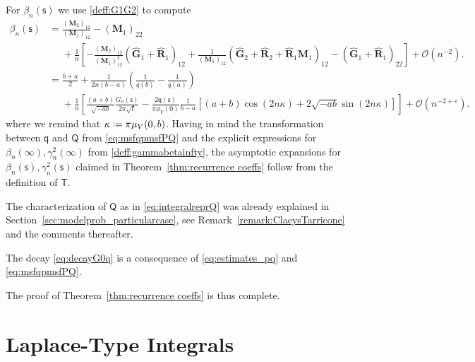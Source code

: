 \documentclass[reqno,a4paper,11pt]{amsart}
\newcommand{\Boh}{\mathcal{O}}
\renewcommand{\bm}{\mathbf}
\newcommand{\msf}{\mathsf}
\newcommand{\wh}{\widehat}
\newcommand{\sad}{\msf s}
\theoremstyle{definition}
\theoremstyle{remark}
\numberwithin{equation}{section}
\newcommand*{\defeq}{\mathrel{\vcenter{\baselineskip0.5ex \lineskiplimit0pt
                     \hbox{\scriptsize.}\hbox{\scriptsize.}}}%
                     =}
\begin{document}
    
    For $\beta_n(\sad)$ we use \eqref{deff:G1G2} to compute
%
\[
    \begin{split}
        \beta_n(\sad) 
            &= \frac{\left( \bm M_2\right)_{12}}{\left( \bm M_1\right)_{12}} - \left( \bm M_1\right)_{22} \\ 
            &\phantom{=} + \frac{1}{n} \left[ 
            - \frac{\left( \bm M_2\right)_{12}}{\left( \bm M_1\right)^2_{12}} \left( \wh{\bm G}_1 + \wh{\bm R}_1\right)_{12} 
            + \frac{1}{\left( \bm M_1\right)_{12}} \left( \wh{\bm G}_2 + \wh{\bm R}_2 + \wh{\bm R}_1 \bm M_1 \right)_{12} 
            - \left( \wh{\bm G}_1 + \wh{\bm R}_1 \right)_{22} 
            \right] + \Boh(n^{-2}). \\
            &= \frac{b+a}{2} +  \frac{1}{2n(b-a)} \left(\frac{1}{q(b)} - \frac{1}{q(a)} \right) \\
            &\phantom{=} + 
            \frac{1}{n} 
            \left[ 
                 \frac{(a+b)}{\sqrt{-ab}} \frac{G_0(\sad)}{2 \pi \sqrt{t}} - \frac{2 \msf q(\sad)}{\pi \phi_V(0)} \frac{1}{b-a} \left[ (a+b) \cos(2n\kappa) + 2 \sqrt{-ab} \sin(2n\kappa)\right]
                \right] + \Boh(n^{-2 + \varepsilon}).
    \end{split}
\]
%
where we remind that $\kappa \defeq \pi \mu_V(0,b)$. Having in mind the transformation between $\msf q$ and $\msf Q$ from \eqref{eq:msfqpmsfPQ} and the explicit expressions for $\beta_n(\infty),\gamma_n^2(\infty)$ from \eqref{deff:gammabetainfty}, the asymptotic expansions for $\beta_n(\sad),\gamma_n^2(\sad)$ claimed in Theorem~\ref{thm:recurrence coeffs} follow from the definition of $\msf T$. 

The characterization of $\msf Q$ as in \eqref{eq:integralreprQ} was already explained in Section~\ref{sec:modelprob_particularcase}, see Remark~\ref{remark:ClaeysTarricone} and the comments thereafter. 

The decay \eqref{eq:decayG0q} is a consequence of \eqref{eq:estimates_pq} and \eqref{eq:msfqpmsfPQ}.

The proof of Theorem~\ref{thm:recurrence coeffs} is thus complete.
    
\appendix

\section{Laplace-Type Integrals}\label{Ap:LaplaceIntegrals}
\end{document}
